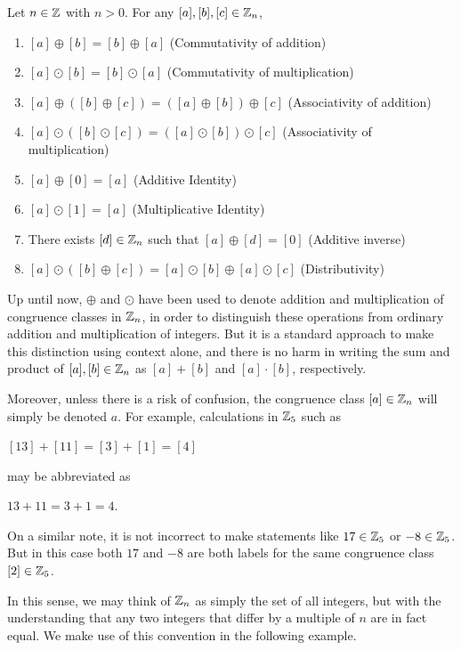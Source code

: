 \documentclass[11pt,fleqn,dvipsnames,usenames]{article}
\newcommand{\p}{\noindent}
\begin{document}
\begin{theorem}  \label{propertiesofZn} Let $n\in\mathbb{Z}$ with $n>0$.  For any $[a], [b], [c]\in\mathbb{Z}_{n}$,
\begin{enumerate}[(1)]
\item $[a] \oplus [b] = [b]\oplus [a]$ \hfill (Commutativity of addition)
\item $[a] \odot [b] = [b]\odot [a]$ \hfill (Commutativity of multiplication)
\item $[a]\oplus ([b]\oplus [c]) = ([a] \oplus [b])\oplus [c]$ \hfill (Associativity of addition)
\item $[a]\odot ([b]\odot [c]) = ([a] \odot [b])\odot [c]$ \hfill (Associativity of multiplication)
\item $[a]\oplus [0] = [a]$ \hfill (Additive Identity)
\item $[a]\odot [1] = [a]$ \hfill (Multiplicative Identity)
\item There exists $[d]\in \mathbb{Z}_{n}$ such that $[a] \oplus [d] = [0]$ \hfill (Additive inverse)
\item $[a]\odot ([b]\oplus [c]) = [a]\odot [b] \oplus [a]\odot [c]$ \hfill (Distributivity)
\end{enumerate}
\end{theorem}
\vsp

%
\p Up until now, $\oplus$ and $\odot$ have been used to denote addition and multiplication of congruence classes in $\mathbb{Z}_{n}$, in order to distinguish these operations from ordinary addition and multiplication of integers.  But it is a standard approach to make this distinction using context alone, and there is no harm in writing the sum and product of $[a],[b]\in \mathbb{Z}_{n}$ as $[a] + [b]$ and $[a]\cdot [b]$, respectively.
\vsp

\p Moreover, unless there is a risk of confusion, the congruence class $[a]\in\mathbb{Z}_{n}$ will simply be denoted $a$.  For example, calculations in $\mathbb{Z}_5$ such as
\begin{center}
$[13] + [11] = [3] + [1] = [4]$
\end{center}
may be abbreviated as
\begin{center}
$13 + 11 = 3 + 1 = 4$.
\end{center}
On a similar note, it is not incorrect to make statements like $17\in\mathbb{Z}_5$ or $-8\in\mathbb{Z}_5$.  But in this case both $17$ and $-8$ are both labels for the same congruence class $[2]\in\mathbb{Z}_5$.
\vsp

\p In this sense, we may think of $\mathbb{Z}_{n}$ as simply the set of all integers, but with the understanding that any two integers that differ by a multiple of $n$ are in fact equal.  We make use of this convention in the following example.
\vsp
\end{document}
